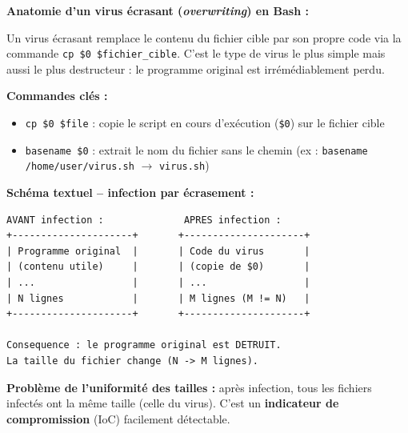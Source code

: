 \documentclass[a4paper,11pt]{article}
\theoremstyle{plain}
\theoremstyle{definition}
\begin{document}
\begin{rappel}
\textbf{Anatomie d'un virus écrasant (\textit{overwriting}) en Bash :}

Un virus écrasant remplace le contenu du fichier cible par son propre code via la commande \texttt{cp \$0 \$fichier\_cible}. C'est le type de virus le plus simple mais aussi le plus destructeur : le programme original est irrémédiablement perdu.

\medskip
\textbf{Commandes clés :}
\begin{itemize}
    \item \texttt{cp \$0 \$file} : copie le script en cours d'exécution (\texttt{\$0}) sur le fichier cible
    \item \texttt{basename \$0} : extrait le nom du fichier sans le chemin (ex : \texttt{basename /home/user/virus.sh} $\rightarrow$ \texttt{virus.sh})
\end{itemize}

\medskip
\textbf{Schéma textuel -- infection par écrasement :}

\begin{lstlisting}[numbers=none,frame=none,backgroundcolor=\color{white},language={}]
AVANT infection :              APRES infection :
+---------------------+       +---------------------+
| Programme original  |       | Code du virus       |
| (contenu utile)     |       | (copie de $0)       |
| ...                 |       | ...                 |
| N lignes            |       | M lignes (M != N)   |
+---------------------+       +---------------------+

Consequence : le programme original est DETRUIT.
La taille du fichier change (N -> M lignes).
\end{lstlisting}

\medskip
\textbf{Problème de l'uniformité des tailles :} après infection, tous les fichiers infectés ont la même taille (celle du virus). C'est un \textbf{indicateur de compromission} (IoC) facilement détectable.
\end{rappel}
\end{document}
